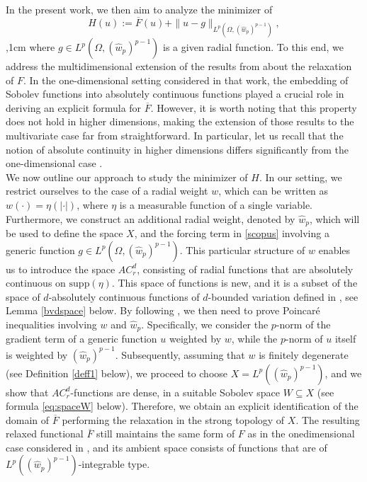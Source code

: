 \documentclass[11pt,leqno]{amsart}
\theoremstyle{remark}
\theoremstyle{definition}
\theoremstyle{definition}
\newcommand{\wstar}{{\hat w}}
\newcommand{\supp}{\mathrm{supp}}
\begin{document}
In the present work, we then aim to analyze the minimizer of 
\begin{equation}\label{scopus}
H(u):=\overline{F}(u)+\|u-g\|_{L^{p}(\Omega,(\wstar_{p})^{p-1})},
\end{equation}
,1cm
where $g\in L^{p}(\Omega,(\wstar_{p})^{p-1})$ is a given radial function. To this end, we address the multidimensional extension of the results from \cite{CCMH1} about the relaxation of $F$. In the one-dimensional setting considered in that work, the embedding of Sobolev functions into absolutely continuous functions played a crucial role in deriving an explicit formula for $\overline{F}$. However, it is worth noting that this property does not hold in higher dimensions, making the extension of those results to the multivariate case far from straightforward. In particular, let us recall that the notion of absolute continuity in higher dimensions differs significantly from the one-dimensional case \cite{Mal}. \\
We now outline our approach to study the minimizer of  $H$. In our setting, we restrict ourselves to the case of a radial weight $w$, which can be written as $w(\cdot) = \eta(|\cdot|)$, where $\eta$ is a measurable function of a single variable. Furthermore, we construct an additional radial weight, denoted by $\wstar_{p}$, which will be used to define the space $X$, and the forcing term in \eqref{scopus} involving a generic function $g\in L^{p}(\Omega,(\wstar_{p})^{p-1})$. This particular structure of $w$ enables us to introduce the space $AC_{r}^{d}$, consisting of radial functions that are absolutely continuous on $\supp(\eta)$. This space of functions is new, and it is a subset of the space of $d$-absolutely continuous functions of $d$-bounded variation defined in \cite{Mal}, see Lemma \autoref{bvdspace} below. By following \cite{CCMH1}, we then need to prove Poincar\'e inequalities involving $w$ and $\hat{w}_{p}$. Specifically, we consider the $p$-norm of the gradient term of a generic function $u$ weighted by $w$, while the $p$-norm of $u$ itself is weighted by $(\hat{w}_{p})^{p-1}$. Subsequently, assuming that $w$ is finitely degenerate (see Definition \ref{deff1} below), we proceed to choose $X=L^{p}((\hat{w}_{p})^{p-1})$, and we show that $AC_{r}^{d}$-functions are dense, in a suitable Sobolev space $W\subseteq X$ (see formula \eqref{eq:spaceW} below). Therefore, we obtain an explicit identification of the domain of $\overline{F}$ performing the relaxation in the strong topology of $X$. The resulting relaxed functional $\overline{F}$ still maintains the same form of $F$ as in the onedimensional case considered in \cite{CCMH1}, and its ambient space consists of functions that are of $L^{p}((\hat{w}_{p})^{p-1})$-integrable type. 
\end{document}
